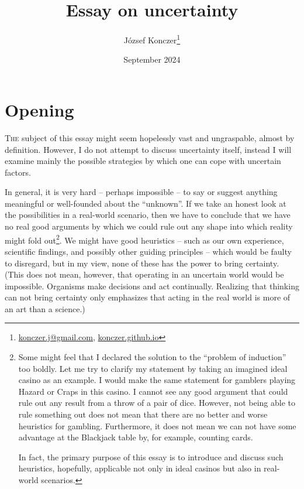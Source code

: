 \documentclass{article}
\title{{\bf Essay on uncertainty} \\ \pgfornament[height=0.8cm]{84}}
\author{József Konczer\footnote{
\href{mailto:konczer.j@gmail.com}{konczer.j@gmail.com},
\href{https://konczer.github.io/}{konczer.github.io}}
}
\date{September 2024}
\begin{document}
\maketitle

\section*{Opening}

\lettrine[lines=2]{T}{he} subject of this essay might seem hopelessly vast and ungraspable, almost by definition.
However, I do not attempt to discuss uncertainty itself, instead I will examine mainly the possible strategies by which one can cope with uncertain factors.

In general, it is very hard -- perhaps impossible -- to say or suggest anything meaningful or well-founded about the ``unknown''. If we take an honest look at the possibilities in a real-world scenario, then we have to conclude that we have no real good arguments by which we could rule out any shape into which reality might fold out\footnote{Some might feel that I declared the solution to the ``problem of induction'' \cite{sep:Induction} too boldly. Let me try to clarify my statement by taking an imagined ideal casino as an example. I would make the same statement for gamblers playing Hazard or Craps in this casino. I cannot see any good argument that could rule out any result from a throw of a pair of dice. However, not being able to rule something out does not mean that there are no better and worse heuristics for gambling. Furthermore, it does not mean we can not have some advantage at the Blackjack table by, for example, counting cards.

In fact, the primary purpose of this essay is to introduce and discuss such heuristics, hopefully, applicable not only in ideal casinos but also in real-world scenarios.
}.
We might have good heuristics -- such as our own experience, scientific findings, and possibly other guiding principles -- which would be faulty to disregard, but in my view, none of these has the power to bring certainty.
(This does not mean, however, that operating in an uncertain world would be impossible. Organisms make decisions and act continually. Realizing that thinking can not bring certainty only emphasizes that acting in the real world is more of an art than a science.)
\end{document}
